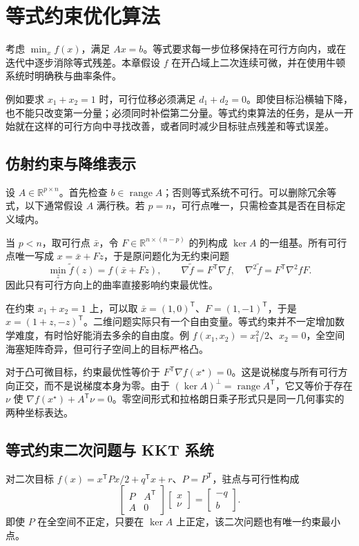\setcounter{chapter}{9} %
\chapter{等式约束优化算法}
\label{ch:co-equality}

考虑 $\min_x f(x)$，满足 $Ax=b$。等式要求每一步位移保持在可行方向内，或在迭代中逐步消除等式残差。本章假设 $f$ 在开凸域上二次连续可微，并在使用牛顿系统时明确秩与曲率条件。

例如要求 $x_1+x_2=1$ 时，可行位移必须满足 $d_1+d_2=0$。即使目标沿横轴下降，也不能只改变第一分量；必须同时补偿第二分量。等式约束算法的任务，是从一开始就在这样的可行方向中寻找改善，或者同时减少目标驻点残差和等式误差。

\section{仿射约束与降维表示}

设 $A\in\mathbb R^{p\times n}$。首先检查 $b\in\operatorname{range}A$；否则等式系统不可行。可以删除冗余等式，以下通常假设 $A$ 满行秩。若 $p=n$，可行点唯一，只需检查其是否在目标定义域内。

当 $p<n$，取可行点 $\bar x$，令 $F\in\mathbb R^{n\times(n-p)}$ 的列构成 $\ker A$ 的一组基。所有可行点唯一写成 $x=\bar x+Fz$，于是原问题化为无约束问题
\[
 \min_z\widetilde f(z)=f(\bar x+Fz),\qquad
 \nabla\widetilde f=F^{\mathsf T}\nabla f,\quad
 \nabla^2\widetilde f=F^{\mathsf T}\nabla^2fF.
\]
因此只有可行方向上的曲率直接影响约束最优性。

在约束 $x_1+x_2=1$ 上，可以取 $\bar x=(1,0)^{\mathsf T}$、$F=(1,-1)^{\mathsf T}$，于是 $x=(1+z,-z)^{\mathsf T}$。二维问题实际只有一个自由变量。等式约束并不一定增加数学难度，有时恰好能消去多余的自由度。例 $f(x_1,x_2)=x_1^2/2$、$x_2=0$，全空间海塞矩阵奇异，但可行子空间上的目标严格凸。

对于凸可微目标，约束最优性等价于 $F^{\mathsf T}\nabla f(x^\star)=0$。这是说梯度与所有可行方向正交，而不是说梯度本身为零。由于 $(\ker A)^\perp=\operatorname{range}A^{\mathsf T}$，它又等价于存在 $\nu$ 使 $\nabla f(x^\star)+A^{\mathsf T}\nu=0$。零空间形式和拉格朗日乘子形式只是同一几何事实的两种坐标表达。

\section{等式约束二次问题与 KKT 系统}

对二次目标 $f(x)=x^{\mathsf T}Px/2+q^{\mathsf T}x+r$、$P=P^{\mathsf T}$，驻点与可行性构成
\[
 \begin{bmatrix}P&A^{\mathsf T}\\A&0\end{bmatrix}
 \begin{bmatrix}x\\\nu\end{bmatrix}
 =\begin{bmatrix}-q\\b\end{bmatrix}.
\]
即使 $P$ 在全空间不正定，只要在 $\ker A$ 上正定，该二次问题也有唯一约束最小点。

